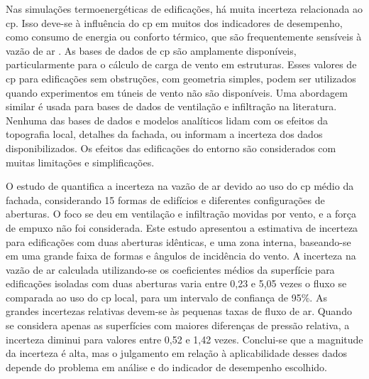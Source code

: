 \documentclass[brazil,hardcopy,openany]{ufscthesis} %
\begin{document}
Nas simulações termoenergéticas de edificações, há muita incerteza relacionada ao \acrshort{cp}. Isso deve-se à influência do \acrshort{cp} em muitos dos indicadores de desempenho, como consumo de energia ou conforto térmico, que são frequentemente sensíveis à vazão de ar \cite{Costola2009}. 
As bases de dados de \acrshort{cp} são amplamente disponíveis, particularmente para o cálculo de carga de vento em estruturas. Esses valores de \acrshort{cp} para edificações sem obstruções, com geometria simples, podem ser utilizados quando experimentos em túneis de vento não são disponíveis. Uma abordagem similar é usada para bases de dados de ventilação e infiltração na literatura. Nenhuma das bases de dados e modelos analíticos lidam com os efeitos da topografia local, detalhes da fachada, ou informam a incerteza dos dados disponibilizados. Os efeitos das edificações do entorno são considerados com muitas limitações e simplificações.

O estudo de  quantifica a incerteza na vazão de ar devido ao uso do \acrshort{cp} médio da fachada, considerando 15 formas de edifícios e diferentes configurações de aberturas. O foco se deu em ventilação e infiltração movidas por vento, e a força de empuxo não foi considerada. Este estudo apresentou a estimativa de incerteza para edificações com duas aberturas idênticas, e uma zona interna, baseando-se em uma grande faixa de formas e ângulos de incidência do vento. A incerteza na vazão de ar calculada utilizando-se os coeficientes médios da superfície para edificações isoladas com duas aberturas varia entre 0,23 e 5,05 vezes o fluxo se comparada ao uso do \acrshort{cp} local, para um intervalo de confiança de 95\%. As grandes incertezas relativas devem-se às pequenas taxas de fluxo de ar. Quando se considera apenas as superfícies com maiores diferenças de pressão relativa, a incerteza diminui para  valores entre 0,52 e 1,42 vezes. Conclui-se que a magnitude da incerteza é alta, mas o julgamento em relação à aplicabilidade desses dados depende do problema em análise e do indicador de desempenho escolhido.
\end{document}
